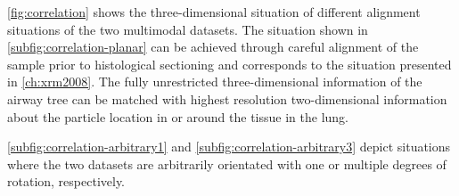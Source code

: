 \autoref{fig:correlation} shows the three-dimensional situation of different alignment situations of the two multimodal datasets. The situation shown in \autoref{subfig:correlation-planar} can be achieved through careful alignment of the sample prior to histological sectioning and corresponds to the situation presented in \autoref{ch:xrm2008}. The fully unrestricted three-dimensional information of the airway tree can be matched with highest resolution two-dimensional information about the particle location in or around the tissue in the lung.

\autoref{subfig:correlation-arbitrary1} and \ref{subfig:correlation-arbitrary3} depict situations where the two datasets are arbitrarily orientated with one or multiple degrees of rotation, respectively.

\renewcommand{\imsize}{1.41\linewidth}%
